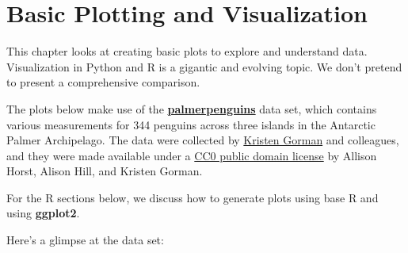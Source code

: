 \documentclass[
]{book}
\newenvironment{Shaded}{\begin{snugshade}}{\end{snugshade}}
\newcommand{\AttributeTok}[1]{\textcolor[rgb]{0.77,0.63,0.00}{#1}}
\newcommand{\DecValTok}[1]{\textcolor[rgb]{0.00,0.00,0.81}{#1}}
\newcommand{\FloatTok}[1]{\textcolor[rgb]{0.00,0.00,0.81}{#1}}
\newcommand{\FunctionTok}[1]{\textcolor[rgb]{0.00,0.00,0.00}{#1}}
\newcommand{\NormalTok}[1]{#1}
\newcommand{\OtherTok}[1]{\textcolor[rgb]{0.56,0.35,0.01}{#1}}
\newcommand{\SpecialCharTok}[1]{\textcolor[rgb]{0.00,0.00,0.00}{#1}}
\begin{document}
\begin{Shaded}
\end{Shaded}

\hypertarget{basic-plotting-and-visualization}{%
\chapter{Basic Plotting and Visualization}\label{basic-plotting-and-visualization}}

This chapter looks at creating basic plots to explore and understand data. Visualization in Python and R is a gigantic and evolving topic. We don't pretend to present a comprehensive comparison.

The plots below make use of the \href{https://allisonhorst.github.io/palmerpenguins/}{\textbf{palmerpenguins}} data set, which contains various measurements for 344 penguins across three islands in the Antarctic Palmer Archipelago. The data were collected by \href{https://www.uaf.edu/cfos/people/faculty/detail/kristen-gorman.php}{Kristen Gorman} and colleagues, and they were made available under a \href{https://creativecommons.org/share-your-work/public-domain/cc0/}{CC0 public domain license} by Allison Horst, Alison Hill, and Kristen Gorman.

For the R sections below, we discuss how to generate plots using base R and using \textbf{ggplot2}.

Here's a glimpse at the data set:
\end{document}
